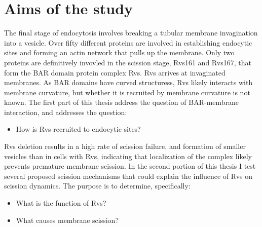 
\chapter{Aims of the study} %

\label{Ch:Aims} %

The final stage of endocytosis involves breaking a tubular membrane invagination into a vesicle. Over fifty different proteins are involved in establishing endocytic sites and forming an actin network that pulls up the membrane. Only two proteins are  definitively invovled in the scission stage, Rvs161 and Rvs167, that form the BAR domain protein complex Rvs. Rvs arrives at invaginated membranes. As BAR domains have curved structuress, Rvs likely interacts with membrane curvature, but whether it is recruited by membrane curvature is not known. The first part of this thesis address the question of BAR-membrane interaction, and addresses the question:


\begin{itemize}
	\item How is Rvs recruited to endocytic sites? 
\end{itemize}

Rvs deletion results in a high rate of scission failure, and formation of smaller vesicles than in cells with Rvs, indicating that localization of the complex likely prevents premature membrane scission. In the second portion of this thesis I test several proposed scission mechanisms that could explain the influence of Rvs on scission dynamics. The purpose is to determine, specifically: 

\begin{itemize}
	\item What is the function of Rvs?
	\item What causes membrane scission? 
\end{itemize}